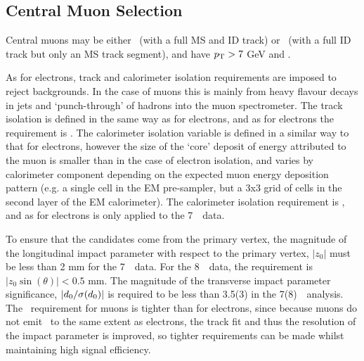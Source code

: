 \subsection{Central Muon Selection}

Central muons may be either \combined\ (with a full MS and ID track) or
\segmentTagged\ (with a full ID track but only an MS track segment), and have $p_{\mathrm{T}}>7$ GeV
and .

As for electrons, track and calorimeter isolation requirements are imposed to
reject backgrounds. In the case of muons this is mainly from heavy flavour
decays in jets and `punch-through' of hadrons into the muon spectrometer.  The
track isolation is defined in the same way as for electrons, and as for
electrons the requirement
is .  The calorimeter isolation variable is defined in a
similar way to that for electrons, however the size of the `core' deposit of energy
attributed to the muon is smaller than in the case of electron isolation, and
varies by calorimeter component depending on the expected muon energy deposition
pattern (e.g. a single cell in the EM pre-sampler, but a 3x3 grid of cells in the second
layer of the EM calorimeter). The calorimeter isolation requirement is
, and as for electrons is only applied to the 7~\tev\ data.

To ensure that the candidates come from the primary vertex, the magnitude of the
longitudinal impact parameter with respect to the primary vertex, $|z_0|$ must
be less than 2 mm for the 7~\tev\ data. For the 8~\tev\ data, the requirement is
$|z_0\sin(\theta)|<0.5$ mm. The magnitude of the transverse impact parameter
significance, $|d_{0} / \sigma (d_{0} )|$ is required to be less than 3.5(3) in the 7(8)~\tev\
analysis. The \dzerosig\ requirement for muons is tighter than for electrons, since because
muons do not emit \brem\ to the same extent as electrons, the track fit and thus
the resolution of the impact parameter is improved, so tighter requirements can
be made whilst maintaining high signal efficiency.

